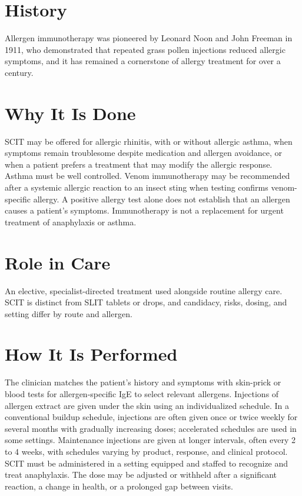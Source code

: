 \section*{History}
Allergen immunotherapy was pioneered by Leonard Noon and John Freeman in 1911, who demonstrated that repeated grass pollen injections reduced allergic symptoms, and it has remained a cornerstone of allergy treatment for over a century.

\section*{Why It Is Done}
SCIT may be offered for allergic rhinitis, with or without allergic asthma, when symptoms remain troublesome despite medication and allergen avoidance, or when a patient prefers a treatment that may modify the allergic response. Asthma must be well controlled. Venom immunotherapy may be recommended after a systemic allergic reaction to an insect sting when testing confirms venom-specific allergy. A positive allergy test alone does not establish that an allergen causes a patient's symptoms. Immunotherapy is not a replacement for urgent treatment of anaphylaxis or asthma.

\section*{Role in Care}
An elective, specialist-directed treatment used alongside routine allergy care. SCIT is distinct from SLIT tablets or drops, and candidacy, risks, dosing, and setting differ by route and allergen.

\section*{How It Is Performed}
The clinician matches the patient's history and symptoms with skin-prick or blood tests for allergen-specific IgE to select relevant allergens. Injections of allergen extract are given under the skin using an individualized schedule. In a conventional buildup schedule, injections are often given once or twice weekly for several months with gradually increasing doses; accelerated schedules are used in some settings. Maintenance injections are given at longer intervals, often every 2 to 4 weeks, with schedules varying by product, response, and clinical protocol. SCIT must be administered in a setting equipped and staffed to recognize and treat anaphylaxis. The dose may be adjusted or withheld after a significant reaction, a change in health, or a prolonged gap between visits.

